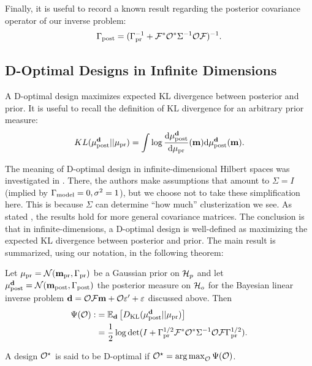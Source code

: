 \documentclass{amsart}
\numberwithin{equation}{section}
\begin{document}
Finally, it is useful to record a known result regarding the posterior
covariance operator of our inverse problem:
\begin{align}\label{eq:postcov}
  \Gamma_{\textup{post}} = (\Gamma_{\textup{pr}}^{-1} + \mathcal{F}^* \mathcal{O}^* \Sigma^{-1} \mathcal{O} \mathcal{F}
  )^{-1}.
\end{align}


\subsection{D-Optimal Designs in Infinite Dimensions}\label{subsec:D optimal design} 
A D-optimal design maximizes expected KL divergence between posterior
and prior. It is useful to recall the definition of KL divergence for
an arbitrary prior measure:
$$
KL(\mu_{\textup{post}}^{\mathbf{d}}||\mu_{\textup{pr}}) = \int \log \frac{\text{\textup{d}} \mu_{\textup{post}}^{\mathbf{d}}}{\text{\textup{d}} \mu_{\textup{pr}}}(\mathbf{m}) \text{\textup{d}} \mu_{\textup{post}}^{\mathbf{d}}(\mathbf{m}).
$$

The meaning of D-optimal design in infinite-dimensional Hilbert spaces
was investigated in \cite{AlexanderianGloorGhattas14}. There, the
authors make assumptions that amount to $\Sigma=I$ (implied by
$\Gamma_{\textup{model}} = 0,\sigma^2=1$), but we choose not to take these
simplification here. This is because $\Sigma$ can determine ``how
much'' clusterization we see. As stated
\cite[pp. 681]{AlexanderianGloorGhattas14}, the results hold for more
general covariance matrices. The conclusion is that in
infinite-dimensions, a D-optimal design is well-defined as maximizing
the expected KL divergence between posterior and prior. The main
result is summarized, using our notation, in the following theorem:
\begin{theorem}
  Let $\mu_{\textup{pr}} = \mathcal{N}(\mathbf{m}_{\textup{pr}},\Gamma_{\textup{pr}})$ be a Gaussian prior on $\mathcal{H}_p$
  and let $\mu_{\textup{post}}^{\mathbf{d}} = \mathcal{N}(\mathbf{m}_{\textup{post}},\Gamma_{\textup{post}})$ the posterior measure
  on $\mathcal{H}_o$ for the Bayesian linear inverse problem $\mathbf{d} = \mathcal{O}
  \mathcal{F}\mathbf{m} + \mathcal{O} \varepsilon' + \varepsilon$ discussed above. Then
  \begin{align}\label{eq:objective}
    \begin{split}
      \Psi( \mathcal{O}) :&= \mathbb{E}_{\mathbf{d}}\left [ D_{\text{KL}} (\mu_{\textup{post}}^{\mathbf{d}} || \mu_{\textup{pr}} ) \right ] \\
      &= \frac12 \log \det 
      ( I + \Gamma_{\textup{pr}}^{1/2}  \mathcal{F} ^* \mathcal{O}^* \Sigma^{-1} \mathcal{O} \mathcal{F} \Gamma_{\textup{pr}}^{1/2}).
    \end{split}
  \end{align}
\end{theorem}
\begin{definition}\label{def:d optimality}
  A design $\mathcal{O}^{\star}$ is said to be D-optimal if $\mathcal{O}^{\star} = \operatorname*{arg\,max}_{\mathcal{O}} \Psi(\mathcal{O})$.
\end{definition}
\end{document}
